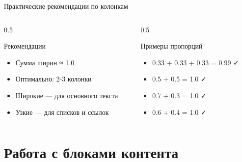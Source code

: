 \documentclass[aspectratio=169]{beamer}
\begin{document}
\begin{frame}{Практические рекомендации по колонкам}
    \begin{columns}[T]
        \begin{column}{0.5\textwidth}
            \begin{block}{Рекомендации}
                \begin{itemize}
                    \item Сумма ширин ≈ 1.0
                    \item Оптимально: 2-3 колонки
                    \item Широкие — для основного текста
                    \item Узкие — для списков и ссылок
                \end{itemize}
            \end{block}
        \end{column}
        
        \begin{column}{0.5\textwidth}
            \begin{exampleblock}{Примеры пропорций}
                \begin{itemize}
                    \item 0.33 + 0.33 + 0.33 = 0.99 ✓
                    \item 0.5 + 0.5 = 1.0 ✓
                    \item 0.7 + 0.3 = 1.0 ✓
                    \item 0.6 + 0.4 = 1.0 ✓
                \end{itemize}
            \end{exampleblock}
        \end{column}
    \end{columns}
\end{frame}

\section{Работа с блоками контента}
\end{document}

